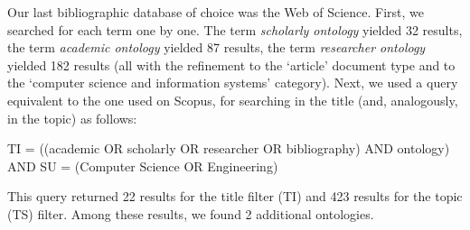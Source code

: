 
Our last bibliographic database of choice was the Web of Science.  First, we searched for each term one by one. The term \textit{scholarly ontology} yielded 32 results, the term \textit{academic ontology} yielded 87 results, the term \textit{researcher ontology} yielded 182 results (all with the refinement to the `article' document type and to the `computer science and information systems' category). Next, we used a query equivalent to the one used on Scopus, for searching in the title (and, analogously, in the topic) as follows:
\begin{lcverbatim}
TI = ((academic OR scholarly OR researcher OR bibliography) 
    AND ontology) AND SU = (Computer Science OR Engineering)
\end{lcverbatim}
This query returned 22 results for the title filter (TI) and 423 results for the topic (TS) filter. Among these results, we found 2 additional ontologies.%



